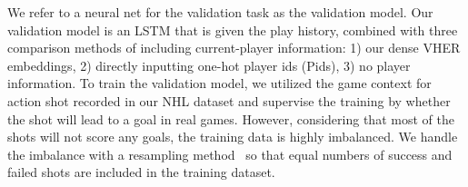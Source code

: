 \documentclass[letterpaper]{article} %
\begin{document}
We refer to a neural net for the validation task as the validation model. Our validation model is an LSTM that is given the play history, combined with three comparison methods of including current-player information: 1) our dense VHER embeddings, 2) directly inputting one-hot player ids (Pids), 3) no player information. 
To train the validation model, we utilized the game context for action shot recorded in our NHL dataset and supervise the training by whether the shot will lead to a goal in real games. However, considering that most of the shots will not score any goals, the training data is highly imbalanced.
We handle the imbalance with a resampling method~\cite{good2006resampling} so that equal numbers of success and failed shots are included in the training dataset. 
\end{document}
